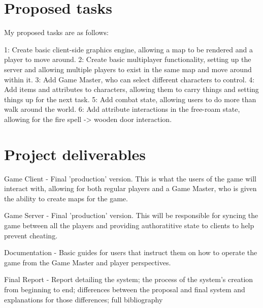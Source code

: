 \documentclass[11pt,fleqn,twoside]{article}
\begin{document}
\section{Proposed tasks}
My proposed tasks are as follows:

1: Create basic client-side graphics engine, allowing a map to be rendered and a player to move around.
2: Create basic multiplayer functionality, setting up the server and allowing multiple players to exist in the same map and move around within it.
3: Add Game Master, who can select different characters to control.
4: Add items and attributes to characters, allowing them to carry things and setting things up for the next task.
5: Add combat state, allowing users to do more than walk around the world.
6: Add attribute interactions in the free-roam state, allowing for the fire spell -> wooden door interaction.

\section{Project deliverables}
Game Client - Final 'production' version. This is what the users of the game will interact with, allowing for both regular players and a Game Master, who is given the ability to create maps for the game.

Game Server - Final 'production' version. This will be responsible for syncing the game between all the players and providing authoratitive state to clients to help prevent cheating.

Documentation - Basic guides for users that instruct them on how to operate the game from the Game Master and player perspectives.

Final Report - Report detailing the system; the process of the system's creation from beginning to end; differences between the proposal and final system and explanations for those differences; full bibliography


%
%
\end{document}

